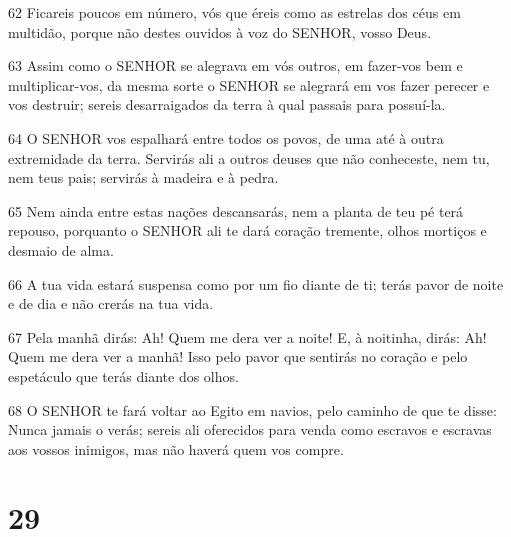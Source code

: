 \par 62 Ficareis poucos em número, vós que éreis como as estrelas dos céus em multidão, porque não destes ouvidos à voz do SENHOR, vosso Deus.
\par 63 Assim como o SENHOR se alegrava em vós outros, em fazer-vos bem e multiplicar-vos, da mesma sorte o SENHOR se alegrará em vos fazer perecer e vos destruir; sereis desarraigados da terra à qual passais para possuí-la.
\par 64 O SENHOR vos espalhará entre todos os povos, de uma até à outra extremidade da terra. Servirás ali a outros deuses que não conheceste, nem tu, nem teus pais; servirás à madeira e à pedra.
\par 65 Nem ainda entre estas nações descansarás, nem a planta de teu pé terá repouso, porquanto o SENHOR ali te dará coração tremente, olhos mortiços e desmaio de alma.
\par 66 A tua vida estará suspensa como por um fio diante de ti; terás pavor de noite e de dia e não crerás na tua vida.
\par 67 Pela manhã dirás: Ah! Quem me dera ver a noite! E, à noitinha, dirás: Ah! Quem me dera ver a manhã! Isso pelo pavor que sentirás no coração e pelo espetáculo que terás diante dos olhos.
\par 68 O SENHOR te fará voltar ao Egito em navios, pelo caminho de que te disse: Nunca jamais o verás; sereis ali oferecidos para venda como escravos e escravas aos vossos inimigos, mas não haverá quem vos compre.

\chapter{29}

